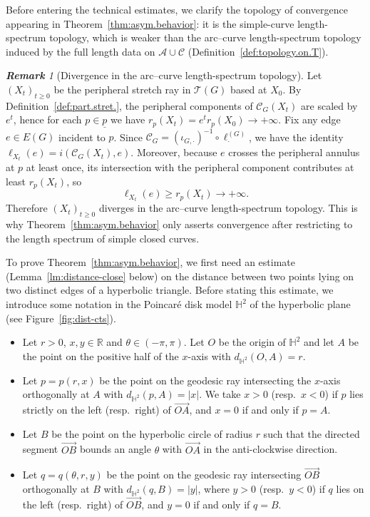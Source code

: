 \documentclass[11pt, letterpaper]{amsart}
\theoremstyle{definition}
\theoremstyle{remark}
\newtheorem{remark}[theorem]{\rm\bf Remark}
\newcommand{\cC}{\mathcal{C}}
\newcommand{\cAC}{\mathcal{A} \cup \mathcal{C}}
\newcommand{\cT}{\mathcal{T}}
\newcommand{\bR}{\mathbb{R}}
\newcommand{\bH}{\mathbb{H}}
\numberwithin{equation}{section}
\begin{document}
Before entering the technical estimates, we clarify the topology of convergence appearing in
Theorem~\ref{thm:asym.behavior}: it is the simple-curve length-spectrum topology, which is weaker than
the arc--curve length-spectrum topology induced by the full length data on \(\cAC\) (Definition~\ref{def:topology.on.T}).

\begin{remark}[Divergence in the arc--curve length-spectrum topology]
\label{rem:topology.convergence.light}
Let \((X_t)_{t\ge 0}\) be the peripheral stretch ray in \(\cT(G)\) based at \(X_0\).
By Definition~\ref{def:part.stret.}, the peripheral components of \(\cC_G(X_t)\) are scaled by \(e^t\),
hence for each \(p\in\underline p\) we have \(r_p(X_t)=e^t r_p(X_0)\to +\infty\).
Fix any edge \(e\in E(G)\) incident to \(p\).
Since \(\cC_G=(\iota_{G,\cdot})^{-1}\circ \ell^{(G)}_{\cdot}\), we have the identity
\(\ell_{X_t}(e)= i(\cC_G(X_t),e)\).
Moreover, because \(e\) crosses the peripheral annulus at \(p\) at least once,
its intersection with the peripheral component contributes at least \(r_p(X_t)\), so
\[
\ell_{X_t}(e)\ge r_p(X_t)\longrightarrow +\infty .
\]
Therefore \((X_t)_{t \geq 0}\) diverges in the arc--curve length-spectrum topology.
This is why Theorem~\ref{thm:asym.behavior} only asserts convergence after restricting
to the length spectrum of simple closed curves.
\end{remark}





To prove Theorem~\ref{thm:asym.behavior}, we first need an estimate (Lemma~\ref{lm:distance-close} below) on the distance between two points lying on two distinct edges of a hyperbolic triangle. Before stating this estimate, we introduce some notation in the Poincaré disk model \(\bH^2\) of the hyperbolic plane (see Figure~\ref{fig:dist-cts}). 

\begin{itemize}
\item Let \(r>0\), \(x,y\in \bR\) and \(\theta\in(-\pi,\pi)\).  Let \(O\) be the origin of \(\bH^2\) and let \(A\) be the point on the positive half of the \(x\)-axis with \(d_{\bH^2}(O,A)=r\). 
\item Let \(p=p(r,x)\) be the point on the geodesic ray intersecting the \(x\)-axis orthogonally at \(A\) with \(d_{\bH^2}(p,A)=|x|\). We take \(x>0\) (resp.\ \(x<0\)) if \(p\) lies strictly on the left (resp.\ right) of \(\overrightarrow{OA}\), and \(x=0\) if and only if \(p=A\). 
\item Let \(B\) be the point on the hyperbolic circle of radius \(r\) such that the directed segment \(\overrightarrow{OB}\) bounds an angle \(\theta\) with \(\overrightarrow{OA}\) in the anti-clockwise direction. 
\item Let \(q=q(\theta, r, y)\) be the point on the geodesic ray intersecting \(\overrightarrow{OB}\) orthogonally at \(B\) with \(d_{\bH^2}(q,B)=|y|\), where \(y>0\) (resp.\ \(y<0\)) if \(q\) lies on the left (resp.\ right) of \(\overrightarrow{OB}\), and \(y=0\) if and only if \(q=B\).
\end{itemize}
\end{document}
